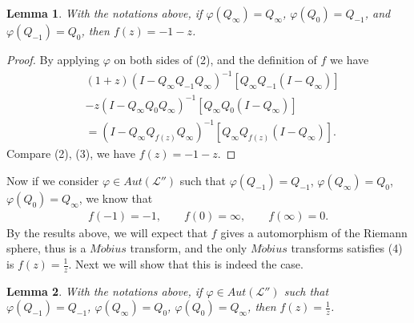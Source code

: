 \documentclass{amsart}
\newcommand{\LLL}{\mathcal L} %
\newtheorem{lemma}{Lemma}[section]
\begin{document}
\begin{lemma}
With the notations above, if $\varphi(Q_{\infty}) = Q_{\infty}$, $\varphi(Q_{0}) = Q_{-1}$,
and $\varphi(Q_{-1}) = Q_{0}$, then $f(z) = -1 - z$.
\end{lemma}

\begin{proof}
By applying $\varphi$ on both sides of (2), and the definition of $f$ we have
\begin{equation}\label{(*)}
\begin{split}
&(1+z)(I - Q_{\infty}Q_{-1}Q_{\infty})^{-1}[Q_{\infty}Q_{-1}(I-Q_{\infty})] \\
& - z(I - Q_{\infty}Q_{0}Q_{\infty})^{-1}[Q_{\infty}Q_{0}(I-Q_{\infty})] \\
&= (I - Q_{\infty}Q_{f(z)}Q_{\infty})^{-1}[Q_{\infty}Q_{f(z)}(I-Q_{\infty})].
\end{split}
\end{equation}
Compare (2), (3), we have $f(z) = -1 - z$.
\end{proof}

Now if we consider $\varphi \in Aut(\LLL'')$ such that $\varphi(Q_{-1}) = Q_{-1}$,
$\varphi(Q_{\infty}) = Q_{0}$, $\varphi(Q_{0}) = Q_{\infty}$, we know that
\begin{align}
f(-1) = -1, \qquad f(0) = \infty, \qquad f(\infty) = 0.
\end{align}
By the results above, we will expect that $f$ gives a automorphism of the Riemann sphere, thus
is a $M\ddot{o}bius$ transform, and the only $M\ddot{o}bius$ transforms satisfies (4) is $f(z) = \frac{1}{z}$.
Next we will show that this is indeed the case.

\begin{lemma}
With the notations above, if $\varphi \in Aut(\LLL'')$ such that $\varphi(Q_{-1}) = Q_{-1}$,
$\varphi(Q_{\infty}) = Q_{0}$, $\varphi(Q_{0}) = Q_{\infty}$, then $f(z) = \frac{1}{z}$.
\end{lemma}
\end{document}
